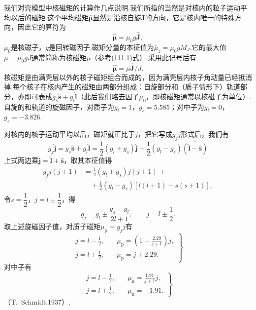 我们对壳模型中核磁矩的计算作几点说明.我们所指的当然是对核内的粒子运动平均以后的磁矩.这个平均磁矩$\bar{\boldsymbol{\mu}}$显然是沿核自旋$\boldsymbol{J}$的方向，它是核内唯一的特殊方向，因此它的算符为
\begin{equation}
  \hat{\boldsymbol{\mu}}=\mu_0 g\hat{\boldsymbol{J}},
\end{equation}
$\mu_0$是核磁子，$g$是回转磁因子.磁矩分量的本征值为$\bar{\mu}_z=\mu_0 gM_J$.它的最大值$\mu=\mu_0 gJ$通常简称为核磁矩$\mu$（参考(111.1)式）.采用此记号后有
\begin{equation}
  \hat{\boldsymbol{\mu}}=\mu\hat{\boldsymbol{J}}/J.
\end{equation}
核磁矩是由满壳层以外的核子磁矩组合而成的，因为满壳层内核子角动量已经抵消掉.每个核子在核内产生的磁矩由两部分组成：自旋部分和（质子情形下）轨道部分，亦即可表成$g_s\hat{\boldsymbol{s}}+g_l\hat{\boldsymbol{l}}$（此后我们略去因子$\mu_0$，即核磁矩通常以核磁子为单位）.自旋的和轨道的旋磁因子，对质子为$g_l=1$，$g_s=5.585$；对中子为$g_l=0$，$g_s=-3.826$.

对核内的核子运动平均以后，磁矩就正比于$j$，把它写成$g_jj$形式后，我们有
\begin{equation*}
  g_j\hat{\boldsymbol{j}}=g_s\hat{\boldsymbol{s}}+g_l\hat{\boldsymbol{l}}
  =\frac{1}{2}\left(g_l+g_s\right)\hat{\boldsymbol{j}}
  +\frac{1}{2}\left(g_l-g_s\right)\overline{\left(\hat{\boldsymbol{l}}-\hat{\boldsymbol{s}}\right)}
\end{equation*}
上式两边乘$\hat{\boldsymbol{j}}=\hat{\boldsymbol{l}}+\hat{\boldsymbol{s}}$，取其本征值得
\begin{equation*}
\begin{aligned}
  g_jj(j+1)&=\frac{1}{2}\left(g_l+g_s\right)j(j+1)\,+\\
  &\quad+\frac{1}{2}\left(g_l-g_s\right)\left[l(l+1)-s(s+1)\right],
\end{aligned}
\end{equation*}
令$s=\dfrac{1}{2}$，$j=l\pm\dfrac{1}{2}$，得
\begin{equation}
  g_j=g_l\pm\frac{g_s-g_l}{2l+1},\qquad j=l\pm\frac{1}{2}.
\end{equation}
取上述旋磁因子值，对质子磁矩$\mu_\mathrm{p}=g_jj$有
\begin{equation}
  \left.
  \begin{aligned}
    j=l-\frac{1}{2},\quad&\mu_\mathrm{p}=\left(1-\frac{2.29}{j+1}\right)j,\\
    j=l+\frac{1}{2},\quad&\mu_\mathrm{p}=j+2.29.
  \end{aligned}
  \right\}
\end{equation}
对中子有
\begin{equation}
  \left.
  \begin{aligned}
    j=l-\frac{1}{2},\quad&\mu_\mathrm{n}=\frac{1.91}{j+1}j,\\
    j=l+\frac{1}{2},\quad&\mu_\mathrm{n}=-1.91.
  \end{aligned}
  \right\}
\end{equation}
（T.~Schmidt,1937）.

